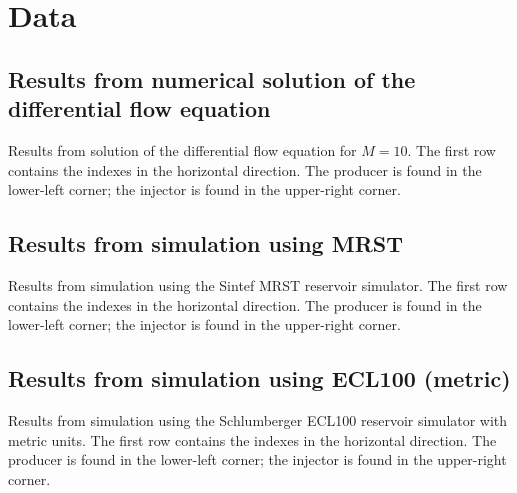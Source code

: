 
\section{Data} %
\label{sec:data}
\subsection{Results from numerical solution of the differential flow equation} %
\label{sub:results_from_numerical_solution_of_the_differential_flow_equation}
Results from solution of the differential flow equation for $M=10$. The first row contains the indexes in the horizontal direction. The producer is found in the lower-left corner; the injector is found in the upper-right corner.

{\tiny
\vspace{.5cm}
\hspace{-1cm}
}

\subsection{Results from simulation using MRST} %
\label{sub:results_from_simulation_using_mrst}
Results from simulation using the Sintef MRST reservoir simulator. The first row contains the indexes in the horizontal direction. The producer is found in the lower-left corner; the injector is found in the upper-right corner.

{\tiny
\vspace{.5cm}
\hspace{-1cm}
}

\subsection{Results from simulation using ECL100 (metric)} %
\label{sub:results_from_simulation_using_ecl100_metric}
Results from simulation using the Schlumberger ECL100 reservoir simulator with metric units. The first row contains the indexes in the horizontal direction. The producer is found in the lower-left corner; the injector is found in the upper-right corner.

